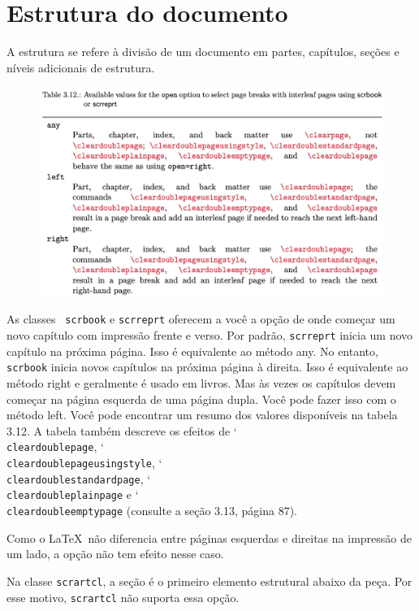 \chapter{Estrutura do documento}
A estrutura se refere à divisão de um documento em partes, capítulos, seções e níveis adicionais de estrutura.
\begin{figure}[h]
    \centering
    \includegraphics[width=0.80\linewidth]{imagem17.png}
    \label{fig:3_12}
\end{figure}

As classes \KOMAScript\ \texttt{scrbook} e \texttt{scrreprt} oferecem a você a opção de onde começar um novo capítulo com impressão frente e verso. Por padrão, \texttt{scrreprt} inicia um novo capítulo na próxima página. Isso é equivalente ao método any. No entanto, \texttt{scrbook} inicia novos capítulos na próxima página à direita. Isso é equivalente ao método right e geralmente é usado em livros. Mas às vezes os capítulos devem começar na página esquerda de uma página dupla. Você pode fazer isso com o método left. Você pode encontrar um resumo dos valores disponíveis na tabela 3.12. A tabela também descreve os efeitos de \char`\\\texttt{clear\-dou\-ble\-pa\-ge}, \char`\\\texttt{clear\-dou\-ble\-pa\-ge\-u\-sing\-sty\-le}, \char`\\\texttt{clear\-dou\-ble\-stan\-dard\-pa\-ge}, \char`\\\texttt{clear\-dou\-ble\-plain\-pa\-ge} e \char`\\\texttt{clear\-dou\-ble\-empty\-pa\-ge} (consulte a seção 3.13, página 87).

Como o \LaTeX\ não diferencia entre páginas esquerdas e direitas na impressão de um lado, a opção não tem efeito nesse caso.

Na classe \texttt{scrartcl}, a seção é o primeiro elemento estrutural abaixo da peça. Por esse motivo, \texttt{scrartcl} não suporta essa opção.

